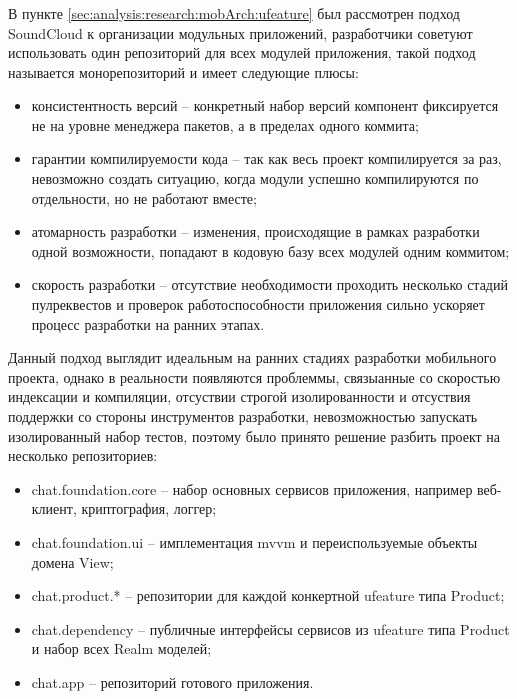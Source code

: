 \subsubsection{}
\label{sec:development:arch:ios:ufeature}

В пункте \ref{sec:analysis:research:mobArch:ufeature} был рассмотрен подход SoundCloud к организации модульных приложений, разработчики советуют использовать один репозиторий для всех модулей приложения, такой подход называется монорепозиторий и имеет следующие плюсы:

\begin{itemize}
\item консистентность версий -- конкретный набор версий компонент фиксируется не на уровне менеджера пакетов, а в пределах одного коммита;
\item гарантии компилируемости кода -- так как весь проект компилируется за раз, невозможно создать ситуацию, когда модули успешно компилируются по отдельности, но не работают вместе;
\item атомарность разработки -- изменения, происходящие в рамках разработки одной возможности, попадают в кодовую базу всех модулей одним коммитом;
\item скорость разработки -- отсутствие необходимости проходить несколько стадий пулреквестов и проверок работоспособности приложения сильно ускоряет процесс разработки на ранних этапах.
\end{itemize}

Данный подход выглядит идеальным на ранних стадиях разработки мобильного проекта, однако в реальности появляются проблеммы, связыанные со скоростью индексации и компиляции, отсуствии строгой изолированности и отсуствия поддержки со стороны инструментов разработки, невозможностью запускать изолированный набор тестов, поэтому было принято решение разбить проект на несколько репозиториев:

\begin{itemize}
\item chat.foundation.core -- набор основных сервисов приложения, например веб-клиент, криптография, логгер;
\item chat.foundation.ui -- имплементация \gls{mvvm} и переиспользуемые объекты домена View;
\item chat.product.* -- репозитории для каждой конкертной \gls{ufeature} типа Product;
\item chat.dependency -- публичные интерфейсы сервисов из \gls{ufeature} типа Product и набор всех Realm моделей;
\item chat.app -- репозиторий готового приложения.
\end{itemize}

